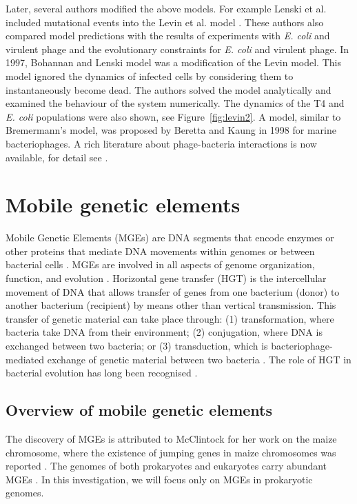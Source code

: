 Later, several authors modified the above models. For example Lenski et al. \cite{lenski_constraints_1985} included mutational events into the Levin et al. model \cite{levin_resource-limited_1977}. These authors also compared model predictions with the results of experiments with \textit{E. coli} and virulent phage and the evolutionary constraints for \textit{E. coli} and virulent phage.  In 1997, Bohannan and Lenski \cite{bohannan_effect_1997} model was a modification of the Levin model. This model ignored the dynamics of infected cells by considering them to instantaneously become dead. The authors solved the model analytically and examined the behaviour of the system numerically. The dynamics of the T4 and \textit{E. coli} populations were also shown, see Figure~\ref{fig:levin2}. A model, similar to Bremermann's model, was proposed by Beretta and Kaung  in 1998 \cite{beretta_modeling_1998} for marine bacteriophages. A rich literature about phage-bacteria interactions is now available, for detail see \cite{payne_understanding_2001, gourley_delay_2004, smith_models_2008}.  

\section{Mobile genetic elements}
Mobile Genetic Elements (MGEs) are DNA segments that encode enzymes or other proteins that mediate DNA movements within genomes or between bacterial cells \cite{frost_mobile_2005}. MGEs are involved in all aspects of genome organization, function, and evolution \cite{craig_mobile_2015, arkhipova_mobile_2016}. Horizontal gene transfer (HGT) is the intercellular movement of DNA that allows transfer of genes from one bacterium (donor) to another bacterium (recipient) by means other than vertical transmission. This transfer of genetic material can take place through: (1) transformation, where bacteria take DNA from their environment; (2) conjugation, where DNA is exchanged between two bacteria; or (3) transduction, which is bacteriophage-mediated exchange of genetic material between two bacteria \cite{soucy_horizontal_2015}. 
The role of HGT in bacterial evolution has long been recognised \cite{huddleston_horizontal_2014, soucy_horizontal_2015}.   
\subsection{Overview of mobile genetic elements}
The discovery of MGEs is attributed to McClintock for her work on the maize chromosome, where the existence of jumping genes in maize chromosomes was reported \cite{mcclintock_origin_1950}. The genomes of both prokaryotes and eukaryotes carry abundant MGEs \cite {schnable_b73_2009, lynch_origins_2007}. In this investigation, we will focus only on MGEs in prokaryotic genomes.  

